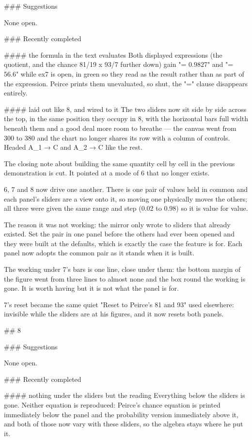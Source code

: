 ### Suggestions

None open.

### Recently completed

#### the formula in the text evaluates
Both displayed expressions (the quotient, and the chance 81/19 x 93/7 further
down) gain "= 0.9827" and "= 56.6" while ex7 is open, in green so they read as
the result rather than as part of the expression. Peirce prints them
unevaluated, so shut, the "=" clause disappears entirely.

#### laid out like 8, and wired to it
The two sliders now sit side by side across the top, in the same position they
occupy in 8, with the horizontal bars full width beneath them and a good deal
more room to breathe — the canvas went from 300 to 380 and the chart no longer
shares its row with a column of controls. Headed A_1 → C and A_2 → C like the
rest.

The closing note about building the same quantity cell by cell in the previous
demonstration is cut. It pointed at a mode of 6 that no longer exists.

6, 7 and 8 now drive one another. There is one pair of values held in common and
each panel's sliders are a view onto it, so moving one physically moves the
others; all three were given the same range and step (0.02 to 0.98) so it is
value for value.

The reason it was not working: the mirror only wrote to sliders that already
existed. Set the pair in one panel before the others had ever been opened and
they were built at the defaults, which is exactly the case the feature is for.
Each panel now adopts the common pair as it stands when it is built.

The working under 7's bars is one line, close under them: the bottom margin of
the figure went from three lines to almost none and the box round the working is
gone. It is worth having but it is not what the panel is for.

7's reset became the same quiet "Reset to Peirce's 81 and 93" used elsewhere:
invisible while the sliders are at his figures, and it now resets both panels.


## 8

### Suggestions

None open.

### Recently completed

#### nothing under the sliders but the reading
Everything below the sliders is gone. Neither equation is reproduced: Peirce's
chance equation is printed immediately below the panel and the probability
version immediately above it, and both of those now vary with these sliders, so
the algebra stays where he put it.

